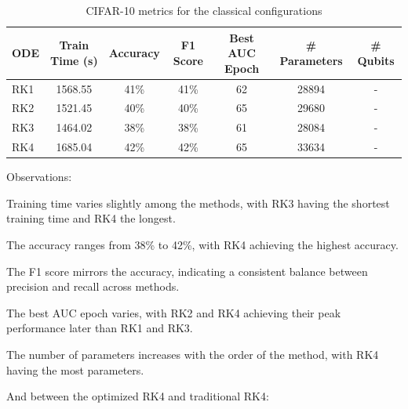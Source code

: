\documentclass[12pt,a4paper]{report}
\begin{document}
\begin{table}[th]\small\linespread{1}
  \label{tab:classical_CIFAR_1}
  \centering
  \begin{tabular}{|l|c|c|c|c|c|c|}
    \hline
    \textbf{ODE} & \textbf{Train Time (s)} & \textbf{Accuracy} & \textbf{F1 Score} & \textbf{Best AUC Epoch} & \textbf{\# Parameters} & \textbf{\# Qubits} \\
    \hline
    RK1          & 1568.55                 & 41\%              & 41\%              & 62                      & 28894                  & -                  \\
    RK2          & 1521.45                 & 40\%              & 40\%              & 65                      & 29680                  & -                  \\
    RK3          & 1464.02                 & 38\%              & 38\%              & 61                      & 28084                  & -                  \\
    RK4          & 1685.04                 & 42\%              & 42\%              & 65                      & 33634                  & -                  \\
    \hline
  \end{tabular}
  \caption{CIFAR-10 metrics for the classical configurations}
\end{table}

Observations:

Training time varies slightly among the methods, with RK3 having the shortest training time and RK4 the longest.

The accuracy ranges from 38\% to 42\%, with RK4 achieving the highest accuracy.

The F1 score mirrors the accuracy, indicating a consistent balance between precision and recall across methods.

The best AUC epoch varies, with RK2 and RK4 achieving their peak performance later than RK1 and RK3.

The number of parameters increases with the order of the method, with RK4 having the most parameters.

\clearpage

And between the optimized RK4 and traditional RK4:
\end{document}
